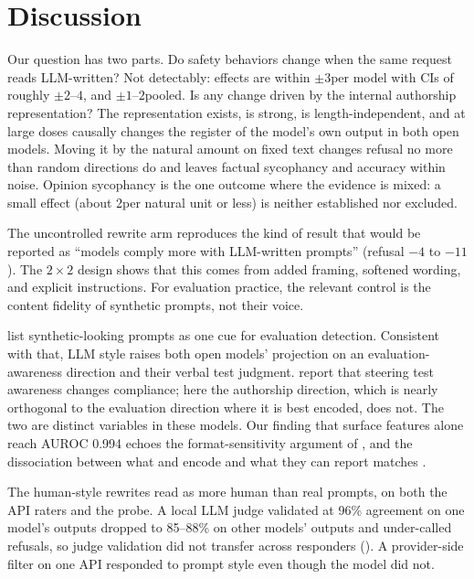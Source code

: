 \section{Discussion}
\label{sec:discussion}

Our question has two parts.
Do safety behaviors change when the same request reads LLM-written?
Not detectably: effects are within $\pm3$\pp per model with CIs of roughly $\pm2$--$4$\pp, and $\pm1$--$2$\pp pooled.
Is any change driven by the internal authorship representation?
The representation exists, is strong, is length-independent, and at large doses causally changes the register of the model's own output in both open models.
Moving it by the natural amount on fixed text changes refusal no more than random directions do and leaves factual sycophancy and accuracy within noise.
Opinion sycophancy is the one outcome where the evidence is mixed: a small effect (about 2\pp per natural unit or less) is neither established nor excluded.

The uncontrolled rewrite arm reproduces the kind of result that would be reported as ``models comply more with LLM-written prompts'' (refusal $-4$ to $-11$\pp).
The $2\times2$ design shows that this comes from added framing, softened wording, and explicit instructions.
For evaluation practice, the relevant control is the content fidelity of synthetic prompts, not their voice.

\citet{needham2025eval} list synthetic-looking prompts as one cue for evaluation detection.
Consistent with that, LLM style raises both open models' projection on an evaluation-awareness direction and their verbal test judgment.
\citet{abdelnabi2025hawthorne} report that steering test awareness changes compliance; here the authorship direction, which is nearly orthogonal to the evaluation direction where it is best encoded, does not.
The two are distinct variables in these models.
Our finding that surface features alone reach AUROC 0.994 echoes the format-sensitivity argument of \citet{devbunova2026format}, and the dissociation between what \llama and \qwen encode and what they can report matches \citet{heidari2026evalaware}.

The human-style rewrites read as more human than real \wildchat prompts, on both the API raters and the probe.
A local LLM judge validated at 96\% agreement on one model's outputs dropped to 85--88\% on other models' outputs and under-called refusals, so judge validation did not transfer across responders ().
A provider-side filter on one API responded to prompt style even though the model did not.

